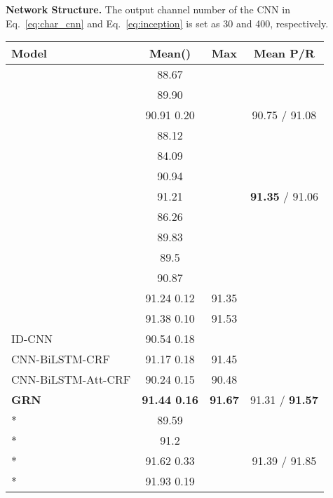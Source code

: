 \documentclass[letterpaper]{article} \usepackage{aaai19}  \usepackage{times}  \usepackage{helvet}  \usepackage{courier}  \usepackage{url}  \usepackage{graphicx}  \usepackage{amsmath}
\newcommand{\GRN}{GRN}
\begin{document}
\textbf{Network Structure.} The output channel number of the CNN in Eq.~\ref{eq:char_cnn} and Eq.~\ref{eq:inception} is set as 30 and 400, respectively.


\begin{table}[t!]
  \centering
    \begin{adjustbox}{max width=\columnwidth}
    \begin{tabular}{|l|c|c|c|}
      \hline
       Model & Mean()  &Max  & Mean P/R \\ \hline
       \cite{collobert2011natural} & 88.67 & &\\ \hline
       \cite{luo2015joint} & 89.90 & &\\ \hline
       \cite{chiu2016named} & 90.91  0.20 & &90.75 / 91.08 \\ \hline
       \cite{zhuo2016segment} & 88.12  & &\\ \hline
       \cite{rei2016attending} &84.09 & &\\ \hline
       \cite{lample2016neural} & 90.94 & &\\ \hline
       \cite{ma2016CNNBLSTMCRF} & 91.21 & &\textbf{91.35} / 91.06 \\ \hline
       \cite{rei2017semi} & 86.26 & &\\ \hline
       \cite{zukov2017neural} &89.83 & &\\ \hline
       \cite{liu2017capturing} &89.5 &  &\\ \hline
       \cite{peters2017semi} & 90.87 & &\\ \hline
       \cite{Liu2018Empower} & 91.24  0.12 &91.35 &\\ \hline
       \cite{Ye2018HSCRF} &91.38  0.10 &91.53 &\\ \hline
       ID-CNN~\cite{strubell2017fast} &90.54  0.18 & &\\ \hline
       CNN-BiLSTM-CRF & 91.17  0.18 &91.45 &\\ \hline
       CNN-BiLSTM-Att-CRF &90.24  0.15 &90.48 &\\ \hline
       \textbf{\GRN{}} & \textbf{ 91.44  0.16} &\textbf{91.67} & 91.31 / \textbf{91.57}\\ \hline
       \hline
       \cite{collobert2011natural}* & 89.59 & &\\ \hline
       \cite{luo2015joint}* & 91.2 &  &\\ \hline
       \cite{chiu2016named}* & 91.62  0.33 & & 91.39 / 91.85 \\ \hline
       \cite{peters2017semi}* & 91.93  0.19  & &\\ \hline

\end{tabular}
\end{adjustbox}
\end{table}
\end{document}
